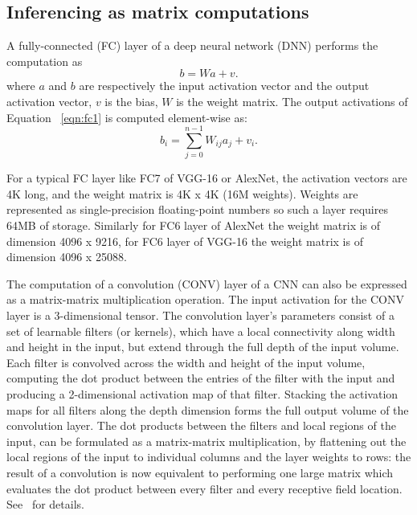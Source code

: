 \subsection{Inferencing as matrix computations}

A fully-connected (FC) layer of a deep neural network (DNN) performs the computation as
\begin{equation}
b = Wa+v.
\label{eqn:fc1}
\end{equation}
where $a$ and $b$ are respectively the input activation vector and the output activation vector, $v$ is the bias, $W$ is the weight matrix.
The output activations of Equation ~\ref{eqn:fc1} is computed element-wise as:
\begin{equation}
b_i = \sum_{j=0}^{n-1}W_{ij}a_j+v_i.
\label{eqn:fc2}
\end{equation}

For a typical FC layer like FC7 of VGG-16 or AlexNet, the activation vectors are 4K long, and the weight matrix is 4K x 4K (16M weights). 
Weights are represented as single-precision floating-point numbers so such a layer requires 64MB of storage. Similarly for FC6 layer of 
AlexNet the weight matrix is of dimension 4096 x 9216, for  FC6 layer of 
VGG-16 the weight matrix is of dimension 4096 x 25088.


The computation of a convolution (CONV) layer of a CNN can also be expressed as a matrix-matrix multiplication operation.
The input activation for the CONV layer is a 3-dimensional tensor.
The convolution layer's parameters consist of a set of learnable filters (or kernels), which have a local connectivity 
along width and height  in the input,
but extend through the full depth of the input volume. Each filter is convolved across the width and height of the input volume, computing the dot product between the entries of the filter with the input and producing a 2-dimensional activation map of that filter. 
Stacking the activation maps for all filters along the depth dimension forms the full output volume of the convolution layer. 
The dot products between the filters and local regions of the input, can be formulated as a matrix-matrix multiplication, by 
flattening out the local regions of the input to individual columns
and the layer weights to rows: the result of a convolution is now equivalent to performing one large matrix which evaluates the dot product between every filter and every receptive field location.
See~\cite{deep_learn}
for details.

